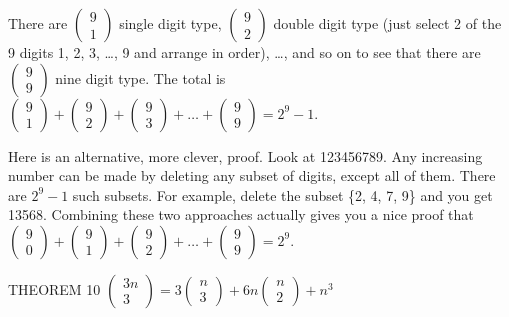 \documentclass{article}
\begin{document}
There are  $\left(\begin{matrix}9\\1\end{matrix}\right)$ single digit type, 
$\left(\begin{matrix}9\\2\end{matrix}\right)$ double digit type (just select 2 of the 9 digits 1, 2, 3, …, 9 and
arrange in order), …, and so on to see that there are  $\left(\begin{matrix}9\\9\end{matrix}\right)$ nine digit type.
The total is 
$\left(\begin{matrix}9\\1\end{matrix}\right)+\left(\begin{matrix}9\\2\end{matrix}\right)+\left(\begin{matrix}9\\3\end{matrix}\right)+{\dots}+\left(\begin{matrix}9\\9\end{matrix}\right)=2^9-1.$

Here is an alternative, more clever, proof.  Look at 123456789.  Any increasing number can be made by deleting any
subset of digits, except all of them.  There are  $2^9-1$ such subsets.  For example, delete the subset \{2, 4, 7, 9\}
and you get 13568.  Combining these two approaches actually gives you a nice proof that 
$\left(\begin{matrix}9\\0\end{matrix}\right)+\left(\begin{matrix}9\\1\end{matrix}\right)+\left(\begin{matrix}9\\2\end{matrix}\right)+{\dots}+\left(\begin{matrix}9\\9\end{matrix}\right)=2^9$.

THEOREM 10  
$\left(\begin{matrix}3n\\3\end{matrix}\right)=3\left(\begin{matrix}n\\3\end{matrix}\right)+6n\left(\begin{matrix}n\\2\end{matrix}\right)+n^3$
\end{document}
